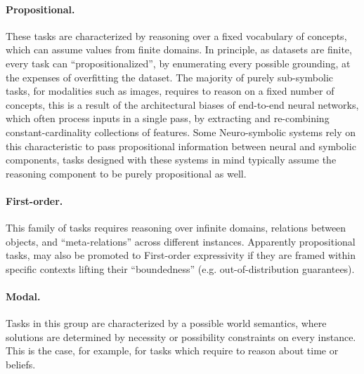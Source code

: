 \paragraph{Propositional.} These tasks are characterized by reasoning over a fixed vocabulary of concepts, which can assume values from finite domains. In principle, as datasets are finite, every task can ``propositionalized'', by enumerating every possible grounding, at the expenses of overfitting the dataset. %
The majority of purely sub-symbolic tasks, for modalities such as images, requires to reason on a fixed number of concepts, this is a result of the architectural biases of end-to-end neural networks, which often process inputs in a single pass, by extracting and re-combining constant-cardinality collections of features. Some Neuro-symbolic systems rely on this characteristic to pass propositional information between neural and symbolic components, tasks designed with these systems in mind typically assume the reasoning component to be purely propositional as well.%

\paragraph{First-order.} This family of tasks requires reasoning over infinite domains, relations between objects, and ``meta-relations'' across different instances. %
Apparently propositional tasks, may also be promoted to First-order expressivity if they are framed within specific contexts lifting their ``boundedness'' (e.g. out-of-distribution guarantees).

\paragraph{Modal.} Tasks in this group are characterized by a possible world semantics, where solutions are determined by necessity or possibility constraints on every instance. This is the case, for example, for tasks which require to reason about time or beliefs.

